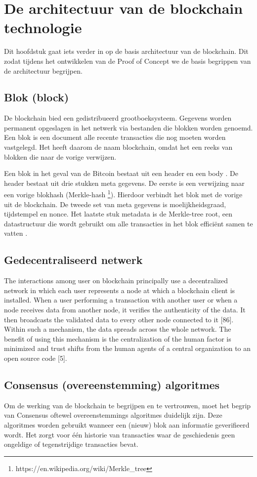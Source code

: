 \chapter{De architectuur van de blockchain technologie}
Dit hoofdstuk gaat iets verder in op de basis architectuur van de blockchain. Dit zodat tijdens het ontwikkelen van de Proof of Concept we de basis begrippen van de architectuur begrijpen.

\section{Blok (block)}
De blockchain bied een gedistribueerd grootboeksysteem. Gegevens worden permanent opgeslagen in het netwerk via bestanden die blokken worden genoemd. Een blok is een document alle recente transacties die nog moeten worden vastgelegd. Het heeft daarom de naam blockchain, omdat het een reeks van blokken die naar de vorige verwijzen\cite{blochchainTechSymmbioticDev}.\par

Een blok in het geval van de Bitcoin bestaat uit een header en een body \cite{blockchainIssuesAndChallenges}. De header bestaat uit drie stukken meta gegevens. De eerste is een verwijzing naar een vorige blokhash (Merkle-hash \footnote{https://en.wikipedia.org/wiki/Merkle\_tree}). Hierdoor verbindt het blok met de vorige uit de blockchain. De tweede set van meta gegevens is  moelijkheidsgraad, tijdstempel en nonce. Het laatste stuk metadata is de Merkle-tree root, een datastructuur die wordt gebruikt om alle transacties in het blok efficiënt samen te vatten \cite{masteringBitcoin}.

\section{Gedecentraliseerd netwerk}
The interactions among user on blockchain principally use a decentralized network in which each user represents a node at which a blockchain client is installed. When a user performing a transaction with another user or when a node receives data from another node, it verifies the authenticity of the data. It then broadcasts the validated data to every other node connected to it [86]. Within such a mechanism, the data spreads across the whole network. The benefit of using this mechanism is the centralization of the human factor is minimized and trust shifts from the human agents of a central organization to an open source code [5].
\newpage

\section{Consensus (overeenstemming) algoritmes}
Om de werking van de blockchain te begrijpen en te vertrouwen, moet het begrip van Consensus oftewel overeenstemmings algoritmes duidelijk zijn. Deze algoritmes worden gebruikt wanneer een (nieuw) blok aan informatie geverifieerd wordt. Het zorgt voor één historie van transacties waar de geschiedenis geen ongeldige of tegenstrijdige transacties bevat.\par

